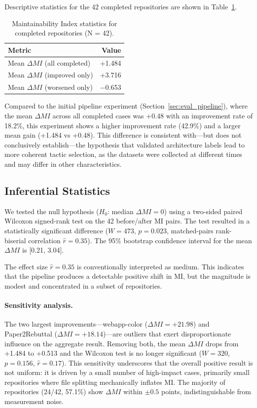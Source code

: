 \documentclass[sigconf,review,anonymous]{acmart}
\begin{document}
Descriptive statistics for the 42 completed repositories are shown in Table~\ref{tab:exp5_mi}.

\begin{table}[H]
\centering
\small
\caption{Maintainability Index statistics for completed repositories (N = 42).}
\label{tab:exp5_mi}
\begin{tabular}{lr}
\toprule
\textbf{Metric} & \textbf{Value} \\
\midrule
Mean $\Delta MI$ (all completed)  & +1.484 \\
Mean $\Delta MI$ (improved only)  & +3.716 \\
Mean $\Delta MI$ (worsened only)  & $-$0.653 \\
\bottomrule
\end{tabular}
\end{table}

Compared to the initial pipeline experiment (Section~\ref{sec:eval_pipeline}), where the mean $\Delta MI$ across all completed cases was +0.48 with an improvement rate of 18.2\%, this experiment shows a higher improvement rate (42.9\%) and a larger mean gain (+1.484 vs +0.48). This difference is consistent with---but does not conclusively establish---the hypothesis that validated architecture labels lead to more coherent tactic selection, as the datasets were collected at different times and may differ in other characteristics.

\subsection{Inferential Statistics}

We tested the null hypothesis ($H_0$: median $\Delta MI = 0$) using a two-sided paired Wilcoxon signed-rank test on the 42 before/after MI pairs. The test resulted in a statistically significant difference ($W = 473$, $p = 0.023$, matched-pairs rank-biserial correlation $\hat{r} = 0.35$). The 95\% bootstrap confidence interval for the mean $\Delta MI$ is [0.21, 3.04].

The effect size $\hat{r} = 0.35$ is conventionally interpreted as medium. This indicates that the pipeline produces a detectable positive shift in MI, but the magnitude is modest and concentrated in a subset of repositories.

\paragraph{Sensitivity analysis.}
The two largest improvements---webapp-color ($\Delta MI = +21.98$) and Paper2Rebuttal ($\Delta MI = +18.14$)---are outliers that exert disproportionate influence on the aggregate result. Removing both, the mean $\Delta MI$ drops from +1.484 to +0.513 and the Wilcoxon test is no longer significant ($W = 320$, $p = 0.156$, $\hat{r} = 0.17$). This sensitivity underscores that the overall positive result is not uniform: it is driven by a small number of high-impact cases, primarily small repositories where file splitting mechanically inflates MI. The majority of repositories (24/42, 57.1\%) show $\Delta MI$ within $\pm 0.5$ points, indistinguishable from measurement noise.
\end{document}
